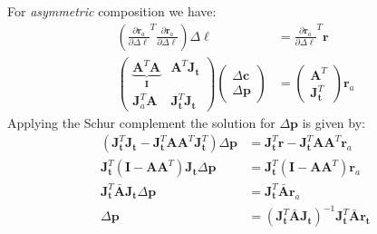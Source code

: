 For \emph{asymmetric} composition we have: 
\begin{equation}
    \begin{aligned}
    	\left( \frac{\partial \mathbf{r}_a}{\partial \Delta \boldsymbol{\ell}}^T \frac{\partial \mathbf{r}_a}{\partial \Delta \boldsymbol{\ell}} \right) \Delta \boldsymbol{\ell} & = \frac{\partial \mathbf{r}_a}{\partial \Delta \boldsymbol{\ell}}^T \mathbf{r}
    	\\
        \begin{pmatrix}
            \underbrace{\mathbf{A}^T \mathbf{A}}_{\mathbf{I}} & \mathbf{A}^T \mathbf{J}_{\mathbf{t}}
            \\ 
            \mathbf{J}_a^T \mathbf{A} & \mathbf{J}_{\mathbf{t}}^T \mathbf{J}_{\mathbf{t}}
        \end{pmatrix}
        \begin{pmatrix}
            \Delta\mathbf{c} 
            \\ 
            \Delta\mathbf{p}
        \end{pmatrix}
        & = 
        \begin{pmatrix}
            \mathbf{A}^T
            \\ 
            \mathbf{J}_{\mathbf{t}}^T
        \end{pmatrix} \mathbf{r}_a
    \label{eq:asymmetric_structure}
    \end{aligned}
\end{equation}
Applying the Schur complement the solution for $\Delta\mathbf{p}$ is given by:
\begin{equation}
    \begin{aligned}
        (\mathbf{J}_{\mathbf{t}}^T\mathbf{J}_{\mathbf{t}} - \mathbf{J}_{\mathbf{t}}^T\mathbf{A}\mathbf{A}^T\mathbf{J}_{\mathbf{t}}^T) \Delta \mathbf{p} & = \mathbf{J}_{\mathbf{t}}^T\mathbf{r} - \mathbf{J}_{\mathbf{t}}^T\mathbf{A} \mathbf{A}^T \mathbf{r}_a
        \\
        \mathbf{J}_{\mathbf{t}}^T(\mathbf{I} - \mathbf{A} \mathbf{A}^T)\mathbf{J}_{\mathbf{t}} \Delta \mathbf{p} & = \mathbf{J}_{\mathbf{t}}^T(\mathbf{I} - \mathbf{A} \mathbf{A}^T)\mathbf{r}_a
        \\
        \mathbf{J}_{\mathbf{t}}^T\bar{\mathbf{A}}\mathbf{J}_{\mathbf{t}} \Delta \mathbf{p} & = \mathbf{J}_{\mathbf{t}}^T\bar{\mathbf{A}}\mathbf{r}_a
        \\
        \Delta \mathbf{p} & = \left( \mathbf{J}_{\mathbf{t}}^T\bar{\mathbf{A}}\mathbf{J}_{\mathbf{t}} \right)^{-1} \mathbf{J}_{\mathbf{t}}^T\bar{\mathbf{A}}\mathbf{r}_{\mathbf{t}}
    \label{eq:asymmetric_schur_solution1}
    \end{aligned}
\end{equation}
